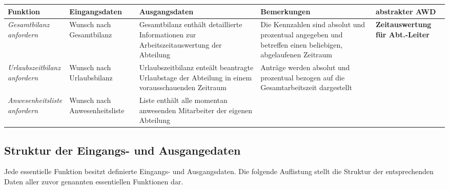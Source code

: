 {
\hspace{-3,5cm}
\footnotesize
\begin{tabular}{|p{3cm}|p{4cm}|p{4cm}|p{4cm}|p{2cm}|}
	\hline
		\textbf{Funktion	} &
		\textbf{Eingangsdaten} &
		\textbf{Ausgangsdaten}&
		\textbf{Bemerkungen}	&
		\textbf{abstrakter AWD} \\
	\hline \hline
		\textit{Gesamtbilanz \newline anfordern} &
		Wunsch nach Gesamtbilanz &
		Gesamtbilanz enthält detaillierte Informationen zur Arbeits\-zeit\-auswertung der Abteilung &
		Die Kennzahlen sind absolut und prozentual angegeben und betreffen einen beliebigen, abgelaufenen Zeitraum &
		\textbf{Zeitaus\-wertung für Abt.-Leiter}\\
	\cline{1-4}
		\textit{Urlaubszeitbilanz \newline anfordern} &
		Wunsch nach Urlaubsbilanz &
		Urlaubszeitbilanz enteält beantragte Urlaubstage der Abteilung in einem vorausschauenden Zeitraum &
		Anträge werden absolut und prozentual bezogen auf die Gesamtarbeitszeit dargestellt &
		\\
	\cline{1-4}
		\textit{Anwesenheitsliste \newline anfordern}&
		Wunsch nach Anwesenheitsliste &
		Liste enthält alle momentan anwesenden Mitarbeiter der eigenen Abteilung &
		&
		\\
	\hline
\end{tabular}
}

\vspace{1cm}

\subsection{Struktur der Eingangs- und Ausgangedaten}
Jede essentielle Funktion besitzt definierte Eingangs- und Ausgangsdaten. Die folgende Auflistung stellt die Struktur der entsprechenden Daten aller zuvor genannten essentiellen Funktionen dar.

